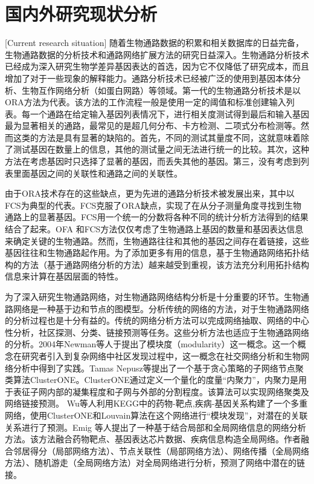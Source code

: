 \section{国内外研究现状分析}[Current research situation]
 随着生物通路数据的积累和相关数据库的日益完备，生物通路数据的分析技术和通路网络扩展方法的研究日益深入。生物通路分析技术已经成为深入研究生物学差异基因表达的首选，因为它不仅降低了研究成本，而且增加了对于一些现象的解释能力。通路分析技术已经被广泛的使用到基因本体分析、生物互作网络分析（如蛋白网路）等领域。第一代的生物通路分析技术是以ORA\cite{goeman2007analyzing}方法为代表。该方法的工作流程一般是使用一定的阈值和标准创建输入列表。每一个通路在给定输入基因列表情况下，进行相关度测试得到最后和输入基因最为显著相关的通路，最常见的是超几何分布、卡方检测、二项式分布检测等。然而这类的方法是具有显著的缺陷的。首先，不同的测试其量度不同，这就意味着除了测试基因在数量上的信息，其他的测试量之间无法进行统一的比较。其次，这种方法在考虑基因时只选择了显著的基因，而丢失其他的基因。第三，没有考虑到列表里面基因之间的关联性和通路之间的关联性。

 由于ORA技术存在的这些缺点，更为先进的通路分析技术被发展出来，其中以FCS\cite{lee2011prioritizing}为典型的代表。FCS克服了ORA缺点，实现了在从分子测量角度寻找到生物通路上的显著基因。FCS用一个统一的分数将各种不同的统计分析方法得到的结果结合了起来。OFA 和FCS方法仅仅考虑了生物通路上基因的数量和基因表达信息来确定关键的生物通路。然而，生物通路往往和其他的基因之间存在着链接，这些基因往往和生物通路起作用。为了添加更多有用的信息，基于生物通路网络拓扑结构的方法（基于通路网络分析的方法）越来越受到重视，该方法充分利用拓扑结构信息来计算在基因层面的特性。

为了深入研究生物通路网络，对生物通路网络结构分析是十分重要的环节。生物通路网络是一种基于边和节点的图模型。分析传统的网络的方法，对于生物通路网络的分析过程也是十分有益的。传统的网络分析方法可以完成网络抽取、网络的中心性分析，社区探测、分类、链接预测等任务。这些分析方法也适应于生物通路网络的分析。2004年Newman\cite{newman2006modularity}等人于提出了模块度（modularity）这一概念。这一个概念在研究者引入到复杂网络中社区发现过程中，这一概念在社交网络分析和生物网络分析中得到了实践。Tamas Nepusz\cite{nepusz2012detecting}等提出了一个基于贪心策略的子网络节点聚类算法ClusterONE\cite{nepusz2012detecting}。ClusterONE通过定义一个量化的度量“内聚力”，内聚力是用于表征子网内部的凝集程度和子网与外部的分割程度。该算法可以实现网络聚类及网络链接预测。 Wu\cite{wu2013computational}等人利用KEGG\cite{kanehisa2008kegg}中的药物-靶点,疾病-基因关系构建了一个多重网络，使用ClusterONE\cite{nepusz2012detecting}和Louvain\cite{blondel2008fast}算法在这个网络进行“模块发现”，对潜在的关联关系进行了预测。Emig \cite{emig2013drug}等人提出了一种基于结合局部和全局网络信息的网络分析方法。该方法融合药物靶点、基因表达芯片数据、疾病信息构造全局网络。作者融合邻居得分（局部网络方法）、节点关联性（局部网络方法）、网络传播（全局网络方法）、随机游走（全局网络方法）对全局网络进行分析，预测了网络中潜在的链接。


